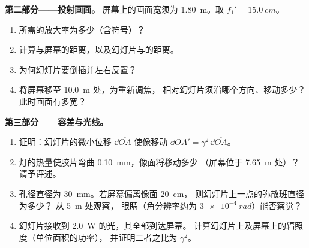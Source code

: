 \begin{problem}
\medskip
\noindent\textbf{第二部分——投射画面。}
屏幕上的画面宽须为 \qty{1.80}{m}。取
$f_1' = \qty{15.0}{cm}$。
\begin{enumerate}[resume]
  \item 所需的放大率为多少（含符号）？
  \item 计算与屏幕的距离，以及幻灯片与的距离。
  \item 为何幻灯片要倒插并左右反置？
  \item 将屏幕移至 \qty{10.0}{m} 处，为重新调焦，
        相对幻灯片须沿哪个方向、移动多少？
        此时画面有多宽？
\end{enumerate}

\medskip
\noindent\textbf{第三部分——容差与光线。}
\begin{enumerate}[resume]
  \item 证明：幻灯片的微小位移 $\dd\overline{OA}$
        使像移动 $\dd\overline{OA'} = \gamma^2\,\dd\overline{OA}$。
  \item 灯的热量使胶片弯曲 \qty{0.10}{mm}，像面将移动多少
        （屏幕位于 \qty{7.65}{m} 处）？
        请予评述。
  \item {}孔径直径为 \qty{30}{mm}。若屏幕偏离像面 \qty{20}{cm}，
        则幻灯片上一点的弥散斑直径为多少？
        从 \qty{5}{m} 处观察，
        眼睛（角分辨率约为 $\qty{3e-4}{rad}$）能否察觉？
  \item 幻灯片接收到 \qty{2.0}{W} 的光，其全部到达屏幕。
        计算幻灯片上及屏幕上的辐照度（单位面积的功率），
        并证明二者之比为 $\gamma^2$。
\end{enumerate}


\end{problem}
